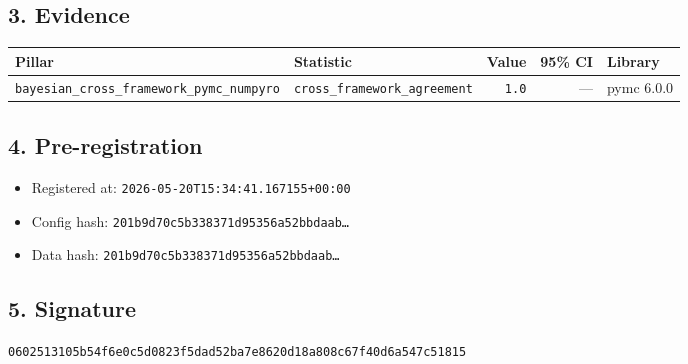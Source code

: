 \documentclass{article}
\begin{document}
\subsection*{3. Evidence}
\begin{tabular}{llrrl}\toprule
\textbf{Pillar} & \textbf{Statistic} & \textbf{Value} & \textbf{95\% CI} & \textbf{Library} \\\midrule
\texttt{bayesian\_cross\_framework\_pymc\_numpyro} & \texttt{cross\_framework\_agreement} & \texttt{1.0} & --- & pymc 6.0.0 \\
\bottomrule\end{tabular}
\subsection*{4. Pre-registration}
\begin{itemize}
\item Registered at: \texttt{2026-05-20T15:34:41.167155+00:00}
\item Config hash: \texttt{201b9d70c5b338371d95356a52bbdaab\dots}
\item Data hash: \texttt{201b9d70c5b338371d95356a52bbdaab\dots}
\end{itemize}
\subsection*{5. Signature}
\texttt{0602513105b54f6e0c5d0823f5dad52ba7e8620d18a808c67f40d6a547c51815}\\
\end{document}
